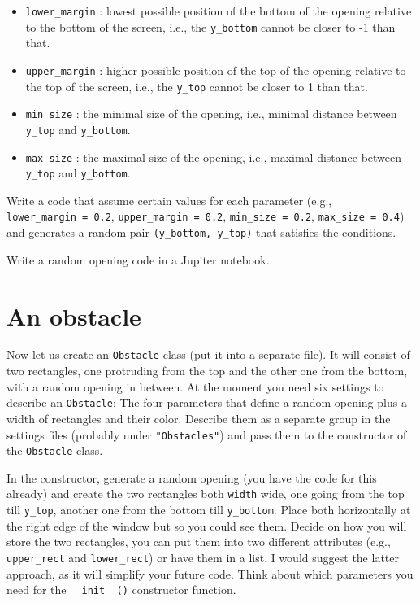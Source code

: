 \documentclass[
]{book}
\providecommand{\tightlist}{%
  \setlength{\itemsep}{0pt}\setlength{\parskip}{0pt}}
\begin{document}
\begin{itemize}
\tightlist
\item
  \texttt{lower\_margin} : lowest possible position of the bottom of the opening relative to the bottom of the screen, i.e., the \texttt{y\_bottom} cannot be closer to -1 than that.
\item
  \texttt{upper\_margin} : higher possible position of the top of the opening relative to the top of the screen, i.e., the \texttt{y\_top} cannot be closer to 1 than that.
\item
  \texttt{min\_size} : the minimal size of the opening, i.e., minimal distance between \texttt{y\_top} and \texttt{y\_bottom}.
\item
  \texttt{max\_size} : the maximal size of the opening, i.e., maximal distance between \texttt{y\_top} and \texttt{y\_bottom}.
\end{itemize}

Write a code that assume certain values for each parameter (e.g., \texttt{lower\_margin\ =\ 0.2}, \texttt{upper\_margin\ =\ 0.2}, \texttt{min\_size\ =\ 0.2}, \texttt{max\_size\ =\ 0.4}) and generates a random pair \texttt{(y\_bottom,\ y\_top)} that satisfies the conditions.

Write a random opening code in a Jupiter notebook.

\hypertarget{an-obstacle}{%
\section{An obstacle}\label{an-obstacle}}

Now let us create an \texttt{Obstacle} class (put it into a separate file). It will consist of two rectangles, one protruding from the top and the other one from the bottom, with a random opening in between. At the moment you need six settings to describe an \texttt{Obstacle}: The four parameters that define a random opening plus a width of rectangles and their color. Describe them as a separate group in the settings files (probably under \texttt{"Obstacles"}) and pass them to the constructor of the \texttt{Obstacle} class.

In the constructor, generate a random opening (you have the code for this already) and create the two rectangles both \texttt{width} wide, one going from the top till \texttt{y\_top}, another one from the bottom till \texttt{y\_bottom}. Place both horizontally at the right edge of the window but so you could see them. Decide on how you will store the two rectangles, you can put them into two different attributes (e.g., \texttt{upper\_rect} and \texttt{lower\_rect}) or have them in a list. I would suggest the latter approach, as it will simplify your future code. Think about which parameters you need for the \texttt{\_\_init\_\_()} constructor function.
\end{document}
